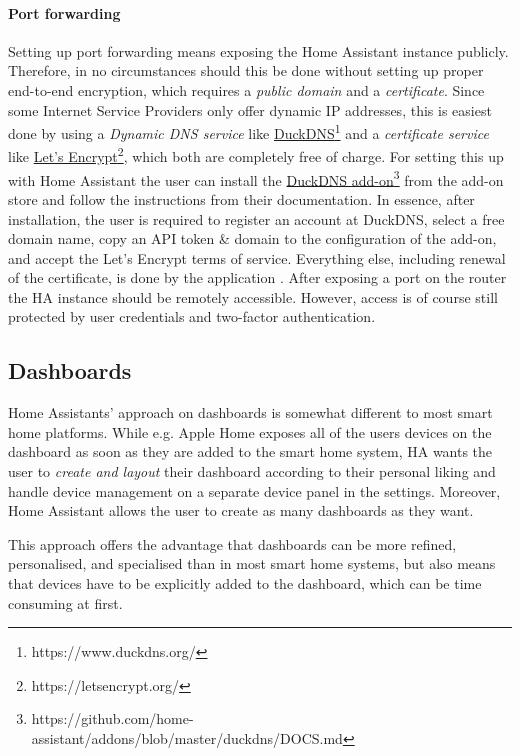 \paragraph{Port forwarding}
Setting up port forwarding means exposing the Home Assistant instance publicly. Therefore, in no circumstances should this be done without setting up proper end-to-end encryption, which requires a \textit{public domain} and a \textit{certificate}. Since some Internet Service Providers only offer dynamic IP addresses, this is easiest done by using a \textit{Dynamic DNS service} \cite{HomeAssistant_Remote_Access} like \href{https://www.duckdns.org/}{DuckDNS}\footnote{https://www.duckdns.org/} and a \textit{certificate service} like \href{https://letsencrypt.org/}{Let's Encrypt}\footnote{https://letsencrypt.org/}, which both are completely free of charge. For setting this up with Home Assistant the user can install the \href{https://github.com/home-assistant/addons/blob/master/duckdns/DOCS.md}{DuckDNS add-on}\footnote{https://github.com/home-assistant/addons/blob/master/duckdns/DOCS.md} from the add-on store and follow the instructions from their documentation. In essence, after installation, the user is required to register an account at DuckDNS, select a free domain name, copy an API token \& domain to the configuration of the add-on, and accept the Let's Encrypt terms of service. Everything else, including renewal of the certificate, is done by the application \cite{HomeAssistant_DuckDNS_github}. After exposing a port on the router the HA instance should be remotely accessible. However, access is of course still protected by user credentials and two-factor authentication. 

\subsection{Dashboards}
Home Assistants' approach on dashboards is somewhat different to most smart home platforms. While e.g. Apple Home exposes all of the users devices on the dashboard as soon as they are added to the smart home system, HA wants the user to \textit{create and layout} their dashboard according to their personal liking and handle device management on a separate device panel in the settings. Moreover, Home Assistant allows the user to create as many dashboards as they want.

This approach offers the advantage that dashboards can be more refined, personalised, and specialised than in most smart home systems, but also means that devices have to be explicitly added to the dashboard, which can be time consuming at first. 

